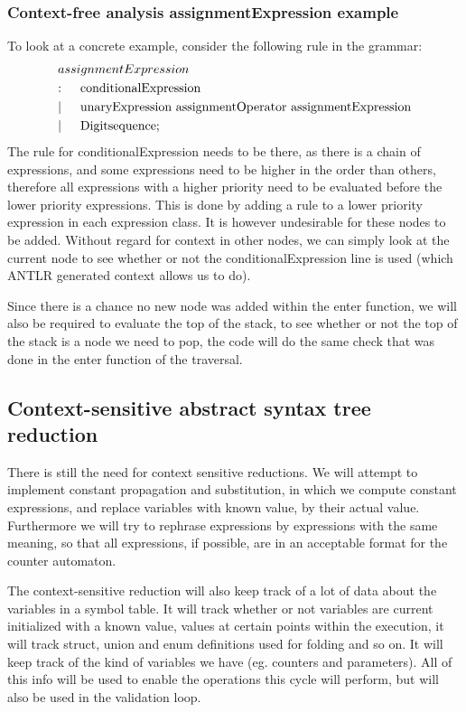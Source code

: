 \documentclass[12pt]{article}
\begin{document}
\subsubsection{Context-free analysis assignmentExpression example}
To look at a concrete example, consider the following rule in the grammar:
\begin{align*}
	&assignmentExpression\\
	&\text{:}\indent \text{conditionalExpression}\\
	&|\indent \text{unaryExpression assignmentOperator assignmentExpression}\\
	&|\indent \text{Digitsequence}; \\
\end{align*}
The rule for conditionalExpression needs to be there, as there is a chain of expressions, and some expressions need to be higher in the order than others, therefore all expressions with a higher priority need to be evaluated before the lower priority expressions. This is done by adding a rule to a lower priority expression in each expression class. It is however undesirable for these nodes to be added. Without regard for context in other nodes, we can simply look at the current node to see whether or not the conditionalExpression line is used (which ANTLR generated context allows us to do).

Since there is a chance no new node was added within the enter function, we will also be required to evaluate the top of the stack, to see whether or not the top of the stack is a node we need to pop, the code will do the same check that was done in the enter function of the traversal.

\subsection{Context-sensitive abstract syntax tree reduction}
There is still the need for context sensitive reductions. We will attempt to implement constant propagation and substitution, in which we compute constant expressions, and replace variables with known value, by their actual value. Furthermore we will try to rephrase expressions by expressions with the same meaning, so that all expressions, if possible, are in an acceptable format for the counter automaton.

The context-sensitive reduction will also keep track of a lot of data about the variables in a symbol table. It will track whether or not variables are current initialized with a known value, values at certain points within the execution, it will track struct, union and enum definitions used for folding and so on. It will keep track of the kind of variables we have (eg. counters and parameters). All of this info will be used to enable the operations this cycle will perform, but will also be used in the validation loop.
\end{document}
